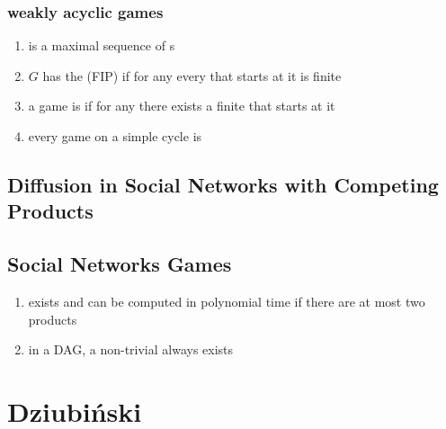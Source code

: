 \documentclass{article}
\newcommand\wassterm[1]{{\color{blue}{#1}}}
\begin{document}
\subsubsection{weakly acyclic games}

\begin{enumerate}
  \item
    \wassterm{improvement path}
    is a maximal sequence of 
    \wassterm{profitable deviation}s
  \item
    $G$ has the
    \wassterm{finite improvement property}
    (FIP) if for any
    \wassterm{joint strategy}
    every 
    \wassterm{improvement path}
    that starts at it is finite

  \item
    a game is
    \wassterm{weakly acyclic}
    if for any 
    \wassterm{joint strategy}
    there exists a finite
    \wassterm{improvement path}
    that starts at it

  \item
    every game on a simple cycle is
    \wassterm{weakly acyclic}



\end{enumerate}

\subsection{Diffusion in Social Networks with Competing Products}

\subsection{Social Networks Games}

\begin{enumerate}
  \item
    \wassterm{Nash equilibrium}
    exists and can be computed in polynomial time if there are at most two products
  \item
    in a DAG, a non-trivial 
    \wassterm{Nash equilibrium}
    always exists
\end{enumerate}




\section{Dziubiński}
\end{document}
